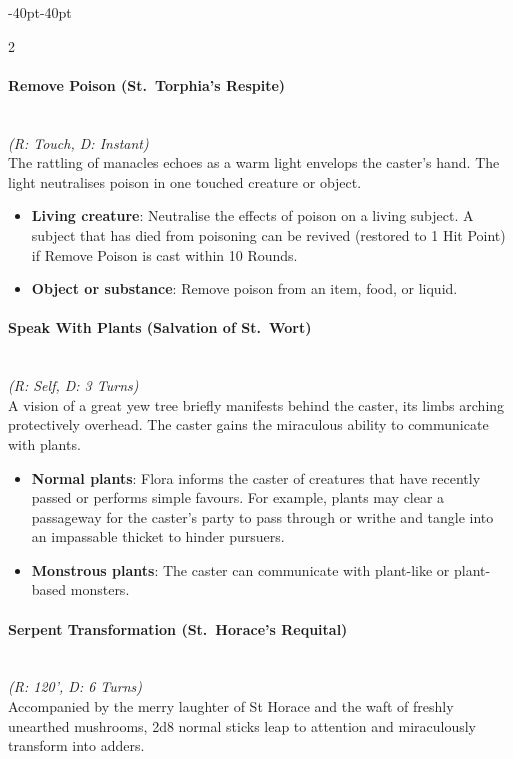 \documentclass{book}
\providecommand{\tightlist}{%
\setlength{\itemsep}{0pt}\setlength{\parskip}{0pt}}
\begin{document}
\begin{adjustwidth}{-40pt}{-40pt}
\begin{multicols}{2}
\paragraph{Remove Poison (St.~Torphia's
	Respite)}\label{remove-poison-st.-torphias-respite}\mbox{}\\
\emph{(R: Touch, D: Instant)}\\
The rattling of manacles echoes as a warm light envelops the caster's
hand. The light neutralises poison in one touched creature or object.

\begin{itemize}
	\tightlist
	\item
	\textbf{Living creature}: Neutralise the effects of poison on a living
	subject. A subject that has died from poisoning can be revived
	(restored to 1 Hit Point) if Remove Poison is cast within 10 Rounds.
	\item
	\textbf{Object or substance}: Remove poison from an item, food, or
	liquid.
\end{itemize}

\paragraph{Speak With Plants (Salvation of
	St.~Wort)}\label{speak-with-plants-salvation-of-st.-wort}\mbox{}\\
\emph{(R: Self, D: 3 Turns)}\\
A vision of a great yew tree briefly manifests behind the caster, its
limbs arching protectively overhead. The caster gains the miraculous
ability to communicate with plants.

\begin{itemize}
	\tightlist
	\item
	\textbf{Normal plants}: Flora informs the caster of creatures that
	have recently passed or performs simple favours. For example, plants
	may clear a passageway for the caster's party to pass through or
	writhe and tangle into an impassable thicket to hinder pursuers.
	\item
	\textbf{Monstrous plants}: The caster can communicate with plant-like
	or plant-based monsters.
\end{itemize}

\paragraph{Serpent Transformation (St.~Horace's
	Requital)}\label{serpent-transformation-st.-horaces-requital}\mbox{}\\
\emph{(R: 120', D: 6 Turns)}\\
Accompanied by the merry laughter of St Horace and the waft of freshly
unearthed mushrooms, 2d8 normal sticks leap to attention and
miraculously transform into adders.


\end{multicols}
\end{adjustwidth}
\end{document}
